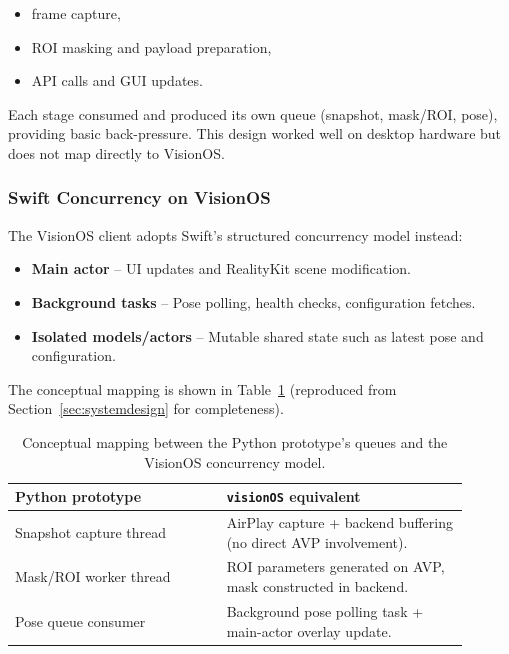 \begin{itemize}
    \item frame capture,
    \item ROI masking and payload preparation,
    \item API calls and GUI updates.
\end{itemize}

Each stage consumed and produced its own queue (snapshot, mask/ROI, pose), providing basic back-pressure. This design worked well on desktop hardware but does not map directly to VisionOS.

\subsubsection{Swift Concurrency on VisionOS}

The VisionOS client adopts Swift’s structured concurrency model instead:

\begin{itemize}
    \item \textbf{Main actor} – UI updates and RealityKit scene modification.
    \item \textbf{Background tasks} – Pose polling, health checks, configuration fetches.
    \item \textbf{Isolated models/actors} – Mutable shared state such as latest pose and configuration.
\end{itemize}

The conceptual mapping is shown in Table~\ref{tab:concurrency_mapping_dev} (reproduced from Section~\ref{sec:systemdesign} for completeness).

\begin{table}[H]
    \centering
    \begin{tabular}{@{}p{0.42\linewidth}p{0.48\linewidth}@{}}
        \toprule
        \textbf{Python prototype} & \textbf{\texttt{visionOS} equivalent} \\
        \midrule
        Snapshot capture thread & AirPlay capture + backend buffering (no direct AVP involvement). \\
        Mask/ROI worker thread & ROI parameters generated on AVP, mask constructed in backend. \\
        Pose queue consumer & Background pose polling task + main-actor overlay update. \\
        \bottomrule
    \end{tabular}
    \caption[Concurrency mapping between Python and VisionOS]{Conceptual mapping between the Python prototype’s queues and the VisionOS concurrency model.}
    \label{tab:concurrency_mapping_dev}
\end{table}

